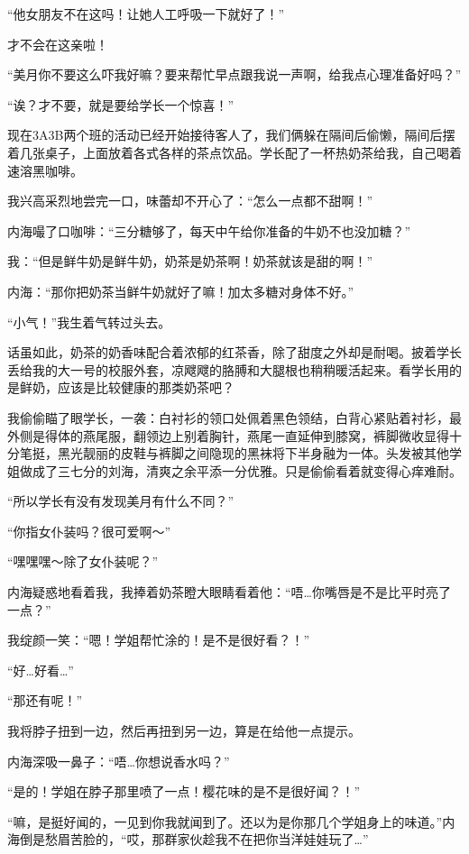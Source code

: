 “他女朋友不在这吗！让她人工呼吸一下就好了！”

才不会在这亲啦！

\cutlinef{\timepast}

“美月你不要这么吓我好嘛？要来帮忙早点跟我说一声啊，给我点心理准备好吗？”

“诶？才不要，就是要给学长一个惊喜！”

现在3A3B两个班的活动已经开始接待客人了，我们俩躲在隔间后偷懒，隔间后摆着几张桌子，上面放着各式各样的茶点饮品。学长配了一杯热奶茶给我，自己喝着速溶黑咖啡。

我兴高采烈地尝完一口，味蕾却不开心了：“怎么一点都不甜啊！”

内海嘬了口咖啡：“三分糖够了，每天中午给你准备的牛奶不也没加糖？”

我：“但是鲜牛奶是鲜牛奶，奶茶是奶茶啊！奶茶就该是甜的啊！”

内海：“那你把奶茶当鲜牛奶就好了嘛！加太多糖对身体不好。”

“小气！”我生着气转过头去。

话虽如此，奶茶的奶香味配合着浓郁的红茶香，除了甜度之外却是耐喝。披着学长丢给我的大一号的校服外套，凉飕飕的胳膊和大腿根也稍稍暖活起来。看学长用的是鲜奶，应该是比较健康的那类奶茶吧？

我偷偷瞄了眼学长，一袭：白衬衫的领口处佩着黑色领结，白背心紧贴着衬衫，最外侧是得体的燕尾服，翻领边上别着胸针，燕尾一直延伸到膝窝，裤脚微收显得十分笔挺，黑光靓丽的皮鞋与裤脚之间隐现的黑袜将下半身融为一体。头发被其他学姐做成了三七分的刘海，清爽之余平添一分优雅。只是偷偷看着就变得心痒难耐。

“所以学长有没有发现美月有什么不同？”

“你指女仆装吗？很可爱啊～”

“嘿嘿嘿～除了女仆装呢？”

内海疑惑地看着我，我捧着奶茶瞪大眼睛看着他：“唔…你嘴唇是不是比平时亮了一点？”

我绽颜一笑：“嗯！学姐帮忙涂的！是不是很好看？！”

“好…好看…”

“那还有呢！”

我将脖子扭到一边，然后再扭到另一边，算是在给他一点提示。

内海深吸一鼻子：“唔…你想说香水吗？”

“是的！学姐在脖子那里喷了一点！樱花味\sakura 的是不是很好闻？！”

“嘛，是挺好闻的，一见到你我就闻到了。还以为是你那几个学姐身上的味道。”内海倒是愁眉苦脸的，“哎，那群家伙趁我不在把你当洋娃娃玩了…”

